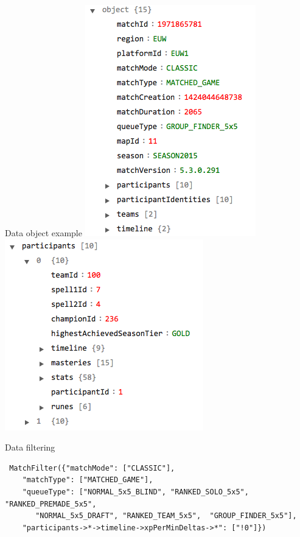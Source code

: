 \begin{frame}{Data object example}
\includegraphics[scale=0.5]{leagueoflegends/gameobject}
\includegraphics[scale=0.5]{leagueoflegends/participant}
\end{frame}
\begin{frame}[fragile]{Data filtering}
\begin{verbatim}
 MatchFilter({"matchMode": ["CLASSIC"],
    "matchType": ["MATCHED_GAME"],
    "queueType": ["NORMAL_5x5_BLIND", "RANKED_SOLO_5x5", "RANKED_PREMADE_5x5",
       "NORMAL_5x5_DRAFT", "RANKED_TEAM_5x5",  "GROUP_FINDER_5x5"],
    "participants->*->timeline->xpPerMinDeltas->*": ["!0"]})
\end{verbatim}
\end{frame}